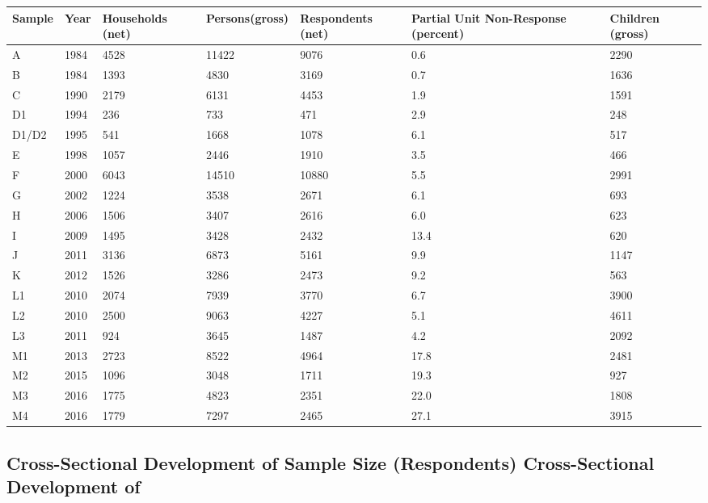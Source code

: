 \documentclass[letterpaper,10pt,openany,onesideH,english]{sphinxmanual}
\begin{document}
\begin{savenotes}\sphinxattablestart
\centering
\begin{tabulary}{\linewidth}[t]{|T|T|T|T|T|T|T|}
\hline
\sphinxstyletheadfamily 
Sample
&\sphinxstyletheadfamily 
Year
&\sphinxstyletheadfamily 
Households (net)
&\sphinxstyletheadfamily 
Persons(gross)
&\sphinxstyletheadfamily 
Respondents (net)
&\sphinxstyletheadfamily 
Partial Unit Non-Response (percent)
&\sphinxstyletheadfamily 
Children (gross)
\\
\hline
A
&
1984
&
4528
&
11422
&
9076
&
0.6
&
2290
\\
\hline
B
&
1984
&
1393
&
4830
&
3169
&
0.7
&
1636
\\
\hline
C
&
1990
&
2179
&
6131
&
4453
&
1.9
&
1591
\\
\hline
D1
&
1994
&
236
&
733
&
471
&
2.9
&
248
\\
\hline
D1/D2
&
1995
&
541
&
1668
&
1078
&
6.1
&
517
\\
\hline
E
&
1998
&
1057
&
2446
&
1910
&
3.5
&
466
\\
\hline
F
&
2000
&
6043
&
14510
&
10880
&
5.5
&
2991
\\
\hline
G
&
2002
&
1224
&
3538
&
2671
&
6.1
&
693
\\
\hline
H
&
2006
&
1506
&
3407
&
2616
&
6.0
&
623
\\
\hline
I
&
2009
&
1495
&
3428
&
2432
&
13.4
&
620
\\
\hline
J
&
2011
&
3136
&
6873
&
5161
&
9.9
&
1147
\\
\hline
K
&
2012
&
1526
&
3286
&
2473
&
9.2
&
563
\\
\hline
L1
&
2010
&
2074
&
7939
&
3770
&
6.7
&
3900
\\
\hline
L2
&
2010
&
2500
&
9063
&
4227
&
5.1
&
4611
\\
\hline
L3
&
2011
&
924
&
3645
&
1487
&
4.2
&
2092
\\
\hline
M1
&
2013
&
2723
&
8522
&
4964
&
17.8
&
2481
\\
\hline
M2
&
2015
&
1096
&
3048
&
1711
&
19.3
&
927
\\
\hline
M3
&
2016
&
1775
&
4823
&
2351
&
22.0
&
1808
\\
\hline
M4
&
2016
&
1779
&
7297
&
2465
&
27.1
&
3915
\\
\hline
\end{tabulary}
\par
\sphinxattableend\end{savenotes}


\subsection{Cross-Sectional Development of Sample Size (Respondents) Cross-Sectional Development of}
\label{\detokenize{Target Population and Samples/index:cross-sectional-development-of-sample-size-respondents-cross-sectional-development-of}}
\begin{figure}[H]
\centering

\noindent{}
\end{figure}
\end{document}
